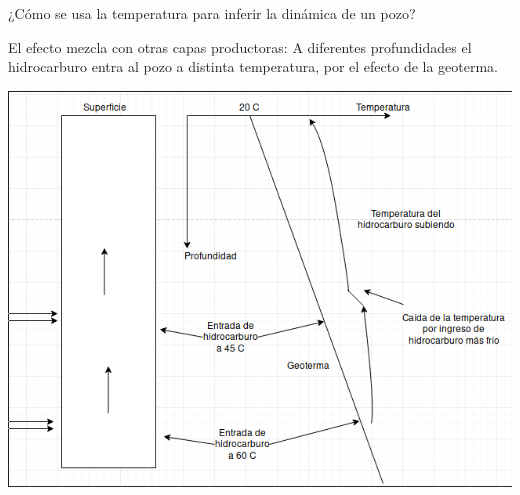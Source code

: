 \documentclass[presentation]{beamer}
\begin{document}
\begin{frame}{¿Cómo se usa la temperatura para inferir la dinámica de un pozo?}
	\begin{block}{El efecto mezcla con otras capas productoras:}
		A diferentes profundidades el hidrocarburo entra al pozo a distinta temperatura, por el efecto de la geoterma.
	\end{block} 
	\includegraphics[height=.65\textheight]{./mezcla.png}
\end{frame}
\end{document}
